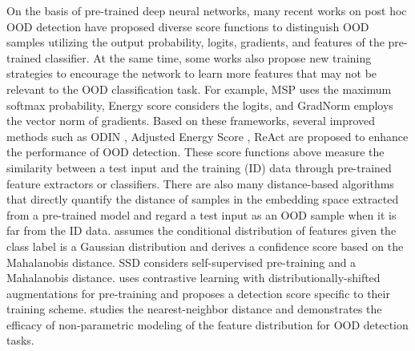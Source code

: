 \documentclass{article} \usepackage{iclr2023_conference,times}
\begin{document}
On the basis of pre-trained deep neural networks, many recent works on post hoc OOD detection have proposed diverse score functions to distinguish OOD samples utilizing the output probability, logits, gradients, and features of the pre-trained classifier. 
At the same time, some works also propose new training strategies to encourage the network to learn more features that may not be relevant to the OOD classification task.
For example,   MSP \citep{hendrycks17baseline} uses the maximum softmax probability, Energy score \citep{liu2020energy} considers the logits, and GradNorm \citep{huang2021importance} employs the vector norm of gradients.
Based on these frameworks, several improved methods such as ODIN \citep{liang2018enhancing}, Adjusted Energy Score \citep{lin2021mood}, ReAct \citep{sun2021react} are proposed to enhance the performance of OOD detection.
These score functions above measure the similarity between a test input and the training (ID) data through pre-trained feature extractors or classifiers.
There are also many distance-based algorithms that directly quantify the distance of samples in the embedding space extracted from a pre-trained model and regard a test input as an OOD sample when it is far from the ID data.
\cite{lee2018simple} assumes the conditional distribution of features given the class label is a Gaussian distribution and derives a confidence score based on the Mahalanobis distance. 
SSD \citep{sehwag2021ssd} considers self-supervised pre-training and a Mahalanobis distance. 
\cite{tack2020csi} uses contrastive learning with distributionally-shifted augmentations for pre-training and proposes a detection score specific to their training scheme.
\cite{sun2022knn} studies the nearest-neighbor distance and demonstrates the efficacy of non-parametric modeling of the feature distribution for OOD detection tasks.
\end{document}
